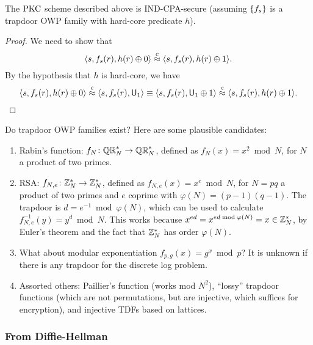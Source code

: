 \documentclass[11pt]{article}
\begin{document}
\begin{theorem}
  \label{thm:td-owp-pkc}
  The $\text{PKC}$ scheme described above is IND-CPA-secure (assuming
  $\{f_{s}\}$ is a trapdoor OWP family with hard-core predicate
  $h$).
\end{theorem}

\begin{proof}
  We need to show that \[ \langle s, f_{s}(r), h(r) \oplus 0 \rangle
  \stackrel{c}{\approx} \langle s, f_{s}(r), h(r) \oplus 1 \rangle. \] By the
  hypothesis that $h$ is hard-core, we have \[ \langle s, f_{s}(r),
  h(r) \oplus 0 \rangle \stackrel{c}{\approx} \langle s, f_{s}(r), \mathsf{U}_{1}
  \rangle \equiv \langle s, f_{s}(r), \mathsf{U}_{1} \oplus 1 \rangle
  \stackrel{c}{\approx} \langle s, f_{s}(r), h(r) \oplus 1 \rangle. \qedhere \]
\end{proof}

Do trapdoor OWP families exist?  Here are some plausible candidates:
\begin{enumerate}

\item Rabin's function: $f_{N} \colon \mathbb{QR}_{N}^{*} \to \mathbb{QR}_{N}^{*}$,
  defined as $f_{N}(x) = x^{2} \bmod N$, for $N$ a product of two
  primes.

\item RSA: $f_{N,e} \colon \mathbb{Z}_N^{*} \to \mathbb{Z}_N^{*}$, defined as $f_{N,
    e}(x) = x^{e} \bmod N$, for $N = pq$ a product of two primes and
  $e$ coprime with $\varphi(N) = (p-1)(q-1)$.  The trapdoor is $d =
  e^{-1} \bmod \varphi(N)$, which can be used to calculate $f_{N,
    e}^{-1}(y) = y^{d} \bmod N$.  This works because $x^{ed} = x^{ed
    \bmod \varphi(N)} = x \in \mathbb{Z}_N^{*}$, by Euler's theorem and the
  fact that $\mathbb{Z}_N^{*}$ has order $\varphi(N)$.

\item What about modular exponentiation $f_{p,g}(x) = g^{x} \bmod p$?
  It is unknown if there is any trapdoor for the discrete log problem.

\item Assorted others: Paillier's function (works mod $N^{2}$),
  ``lossy'' trapdoor functions (which are not permutations, but are
  injective, which suffices for encryption), and injective TDFs based
  on lattices.
\end{enumerate}

\subsubsection{From Diffie-Hellman}
\label{sec:from-diffie-hellman}
\end{document}
